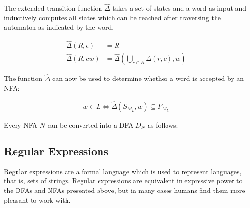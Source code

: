 \begin{definition}
    The extended transition function $\hat\Delta$ takes a set of states and a
    word as input and inductively computes all states which can be reached
    after traversing the automaton as indicated by the word.

    \begin{align}
        \hat\Delta(R, \epsilon) &= R \\
        \hat\Delta(R, c w) &= \hat\Delta(\bigcup\limits_{r \in R} \Delta(r, c), w)
    \end{align}
\end{definition}

The function $\hat\Delta$ can now be used to determine whether a word is accepted by an NFA:

\begin{align}
    w \in L \Leftrightarrow \hat\Delta(S_{M_L}, w) \subseteq F_{M_L}
\end{align}

\begin{definition}
    Every NFA $N$ can be converted into a DFA $D_N$ as follows:
\end{definition}

\subsection{Regular Expressions}

Regular expressions are a formal language which is used to represent languages, that is, sets of strings.
Regular expressions are equivalent in expressive power to the DFAs and NFAs presented above,
but in many cases humans find them more pleasant to work with.


